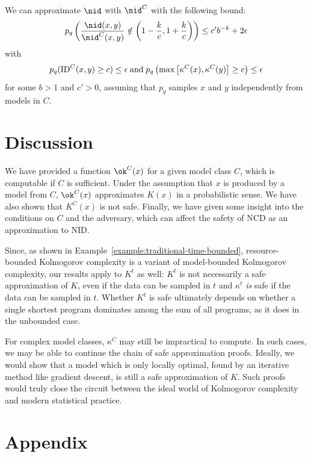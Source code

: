 \begin{theorem}\footnotemark[2]
We can approximate $\nid$ with $\nid^C$ with the following bound:
\[
p_q\left(\frac{\nid(x, y)}{\nid^C(x, y)} \notin \left (1 - \frac{k}{c}, 1 + \frac{k}{c}\right ) \right) \leq c'b^{-k} + 2\epsilon
\]
with 
\begin{align*}
p_q(\text{\textnormal{ID}}^C(x, y) \geq c) \leq \epsilon \;\text{and}\; p_q\left(\max \left[\kappa^C(x), \kappa^C(y)\right] \geq c\right) \leq \epsilon
\end{align*}
for some $b > 1$ and $c' > 0$, assuming that $p_q$ samples $x$ and $y$ independently from models in $C$.
\label{theorem:safe-nid}
\end{theorem}

\section{Discussion}

We have provided a function $\ok^C(x)$ for a given model class $C$, which is computable if $C$ is sufficient. Under the assumption that $x$ is produced by a model from $C$, $\ok^C(x)$ approximates $K(x)$ in a probabilistic sense. We have also shown that $K^C(x)$ is not safe. Finally, we have given some insight into the conditions on $C$ and the adversary, which can affect the safety of NCD as an approximation to NID.

Since, as shown in Example~\ref{example:traditional-time-bounded}, resource-bounded Kolmogorov complexity is a variant of model-bounded Kolmogorov complexity, our results apply to $K^t$ as well: $K^t$ is not necessarily a safe approximation of $K$, even if the data can be sampled in $t$ and $\kappa^t$ \emph{is} safe if the data can be sampled in $t$. Whether $K^t$ is safe ultimately depends on whether a single shortest program dominates among the sum of all programs, as it does in the unbounded case.

For complex model classes, $\kappa^C$ may still be impractical to compute. In such cases, we may be able to continue the chain of safe approximation proofs. Ideally, we would show that a model which is only locally optimal, found by an iterative method like gradient descent, is still a safe approximation of $K$. Such proofs would truly close the circuit between the ideal world of Kolmogorov complexity and modern statistical practice.

\section{Appendix}
\renewcommand*{\thefootnote}{\arabic{footnote}} 

